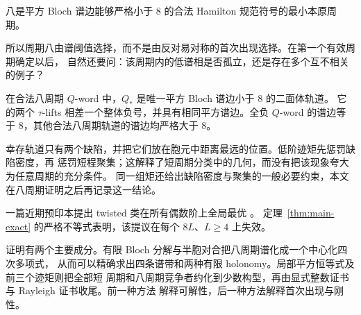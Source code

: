 \begin{theorem}
\label{thm:main-minimal}
八是平方 Bloch 谱边能够严格小于 $8$ 的合法 Hamilton 规范符号的最小本原周期。
\end{theorem}

所以周期八由谱阈值选择，而不是由反对易对称的首次出现选择。在第一个有效周期确定以后，
自然还要问：该周期内的低谱相是否孤立，还是存在多个互不相关的例子？

\begin{theorem}
\label{thm:main-rigidity}
在合法八周期 $Q$-word 中，$Q_*$ 是唯一平方 Bloch 谱边小于 $8$ 的二面体轨道。
它的两个 $\tau$-lifts 相差一个整体负号，并具有相同平方谱边。全负 $Q$-word 的谱边等于
$8$，其他合法八周期轨道的谱边均严格大于 $8$。
\end{theorem}

幸存轨道只有两个缺陷，并把它们放在胞元中距离最远的位置。低阶迹矩先惩罚缺陷密度，再
惩罚短程聚集；这解释了短周期分类中的几何，而没有把该现象夸大为任意周期的充分条件。
同一组矩还给出缺陷密度与聚集的一般必要约束，本文在八周期证明之后再记录这一结论。

一篇近期预印本提出 twisted 类在所有偶数阶上全局最优 \cite{Suvagiya2026}。
定理~\ref{thm:main-exact} 的严格不等式表明，该提议在每个 $8L$、$L\geq4$ 上失效。

证明有两个主要成分。有限 Bloch 分解与半胞对合把八周期谱化成一个中心化四次多项式，
从而可以精确求出四条谱带和两种有限 holonomy。局部平方恒等式及前三个迹矩则把全部短
周期和八周期竞争者约化到少数构型，再由显式整数证书与 Rayleigh 证书收尾。前一种方法
解释可解性，后一种方法解释首次出现与刚性。
